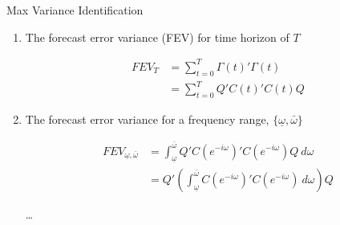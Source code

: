   
    \begin{frame}{Max Variance Identification}
  
      \begin{enumerate}
        \item The forecast error variance (FEV) for time horizon of $T$
      
      \vspace{-1cm}
      \begin{align*}
        FEV_{T} &= \sum_{t=0}^{T} \Gamma(t)'\Gamma(t)
        \\
        &= \sum_{t=0}^{T} Q'C(t)'C(t)Q
      \end{align*}
      \vspace{-1cm}
      
        \item The forecast error variance for a frequency range, $\{\underline{\omega}, \bar{\omega}\}$
        
        \vspace{-1cm}
        \begin{align*}
          FEV_{\underline{\omega}, \bar{\omega}} &= \int_{\underline{\omega}}^{\bar{\omega}} Q'C(e^{-i\omega})'C(e^{-i\omega})Q \ d\omega
          \\
          &= Q' \left( \int_{\underline{\omega}}^{\bar{\omega}} C(e^{-i\omega})'C(e^{-i\omega}) \ d\omega \right) Q
        \end{align*}
        \vspace{-1cm}
      
        \dots
      \end{enumerate}
      
      \end{frame}